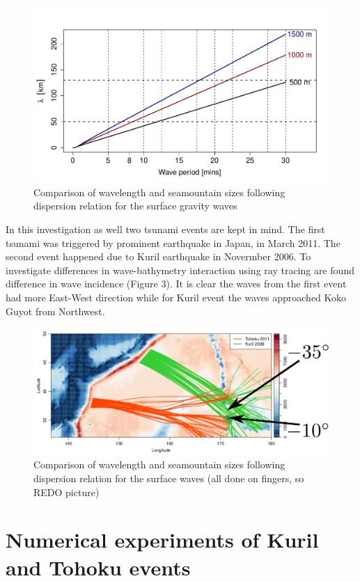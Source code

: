 \begin{figure}
\includegraphics[scale=0.5]{../figures/tsunami_regimes.pdf}
\caption{Comparison of wavelength and seamountain sizes following dispersion relation for the surface gravity waves}
\end{figure}

In this investigation as well two tsunami events are kept in mind. The first tsunami was triggered by prominent earthquake in Japan, in March 2011. The second event happened due to Kuril earthquake in Novermber 2006. To investigate differences in wave-bathymetry interaction using ray tracing are found difference in wave incidence (Figure 3). It is clear the waves from the first event had more East-West direction while for Kuril event the waves approached Koko Guyot from Northwest.
\begin{figure}
\includegraphics[scale=0.5]{../figures/koko_rays.pdf}
\caption{Comparison of wavelength and seamountain sizes following dispersion relation for the surface waves (all done on fingers, so REDO picture)}
\end{figure}

\newpage

\section{Numerical experiments of Kuril and Tohoku events}

